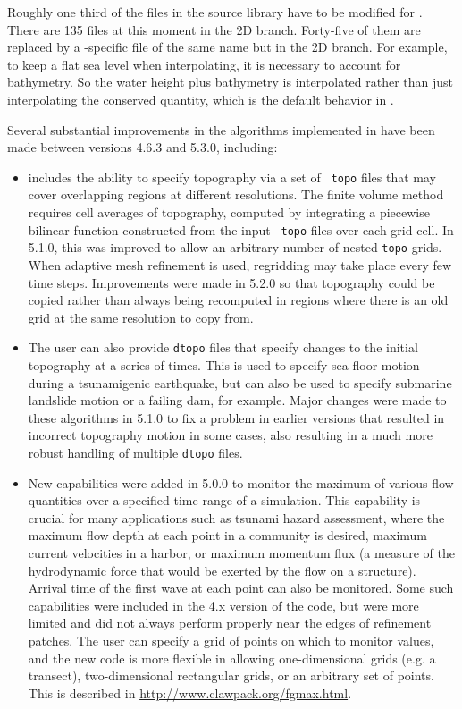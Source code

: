 Roughly one third of the files in the \amrclaw source library
have to be modified for \geoclaw. 
There are 135 files at this moment 
in the \amrclaw 2D branch.
Forty-five of them are replaced by a \geoclaw-specific file of the
same name but in the \geoclaw 2D branch. 
For example, to keep a flat
sea level when interpolating, it is necessary to account for bathymetry.
So the water height plus bathymetry is interpolated rather than just
interpolating the conserved quantity, which is the default behavior in
\amrclaw.

Several substantial improvements in the
algorithms implemented in \geoclaw have been made between versions 4.6.3 and
5.3.0, including:

\begin{itemize} 
\item \geoclaw includes the ability to specify topography via a set of {\tt
topo} files that may cover overlapping regions at different resolutions. The
finite volume method requires cell averages of topography, computed by
integrating a piecewise bilinear function constructed from the input {\tt
topo} files over each grid cell.  In 5.1.0, this was improved to 
allow an arbitrary number of nested {\tt topo} grids.
When adaptive mesh refinement is used,
regridding may take place every few time steps.  Improvements were made 
in 5.2.0 so that topography could be copied rather than always being
recomputed in regions where there is an old grid at the same resolution to
copy from.  

\item The user can also provide {\tt dtopo} files that specify changes to the
initial topography at a series of times.  This is used to specify sea-floor
motion during a tsunamigenic earthquake, but can also be used to specify
submarine landslide motion or a failing dam, for example. Major changes were
made to these algorithms in 5.1.0 to fix a problem in earlier versions that
resulted in incorrect topography motion in some cases, also resulting in a much
more robust handling of multiple  {\tt dtopo} files.

\item New capabilities were added in 5.0.0 to monitor the maximum of various
flow quantities over a specified time range of a simulation.  This capability is
crucial for many applications such as tsunami hazard assessment, where the
maximum flow depth at each point in a community is desired, maximum current
velocities in a harbor, or maximum momentum flux (a measure of the hydrodynamic
force that would be exerted by the flow on a structure).  Arrival time of the
first wave at each point can also be monitored.  Some such capabilities were
included in the 4.x version of the code, but were more limited and did not
always perform properly near the edges of refinement patches.  The user can
specify a grid of points on which to monitor values, and the new code is more
flexible in allowing one-dimensional grids (e.g. a transect), two-dimensional
rectangular grids, or an arbitrary set of points.
This is described in 
\url{http://www.clawpack.org/fgmax.html}.


\end{itemize}
